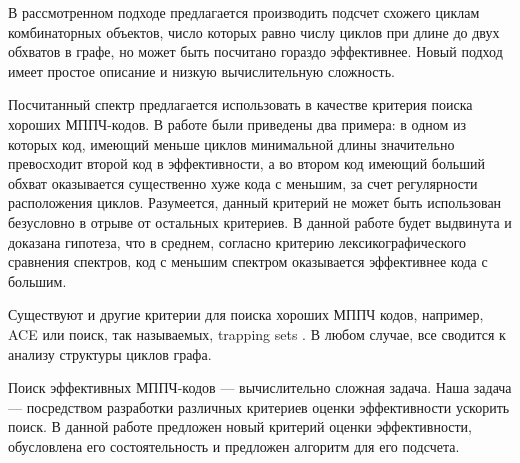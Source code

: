 В рассмотренном подходе предлагается производить подсчет схожего циклам комбинаторных объектов,
число которых равно числу циклов при длине до двух обхватов в графе, но может быть посчитано гораздо эффективнее.
Новый подход имеет простое описание и низкую вычислительную сложность.

Посчитанный спектр предлагается использовать в качестве критерия поиска хороших МППЧ-кодов.
В работе \cite{algorithm-for-counting-for-counting-short-cycles-in-bipartite-graphs} были приведены два примера:
в одном из которых код, имеющий меньше циклов минимальной длины значительно превосходит второй код в
эффективности, а во
втором код имеющий больший обхват оказывается существенно хуже кода с меньшим, за счет регулярности
расположения циклов. Разумеется, данный критерий не может быть использован безусловно
в отрыве от остальных критериев. В данной работе будет выдвинута и доказана гипотеза, что в среднем, согласно
критерию лексикографического сравнения спектров, код с меньшим спектром оказывается эффективнее кода с большим.

Существуют и другие критерии для поиска хороших МППЧ кодов, например, ACE \cite{ace} или 
поиск, так называемых, trapping sets \cite{trapping-sets}. 
В любом случае, все сводится к анализу структуры циклов графа. 


Поиск эффективных МППЧ-кодов --- вычислительно сложная задача.
Наша задача --- посредством разработки различных критериев оценки эффективности ускорить поиск. 
В данной работе предложен новый критерий оценки эффективности, обусловлена его состоятельность и предложен
алгоритм для его подсчета.









































